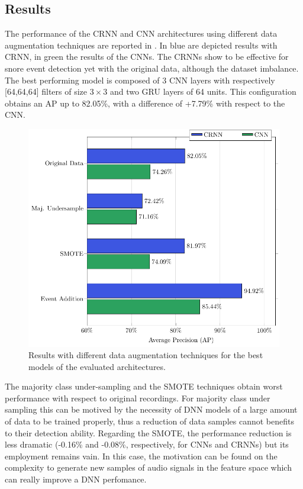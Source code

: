 \subsection{Results}
The performance of the CRNN and CNN architectures using different data augmentation techniques are reported in . In blue are depicted results with CRNN, in green the results of the CNNs. The CRNNs show to be effective for snore event detection yet with the original data, although the dataset imbalance. The best performing model is composed of 3 CNN layers with respectively [64,64,64] filters of size $3\times3$ and two GRU layers of 64 units. This configuration obtains an AP up to 82.05\%, with a difference of +7.79\% with respect to the CNN.

\begin{figure}[h]
	\centering
	\includegraphics[width=0.7\columnwidth]{img/grafTex/results.pdf}
	\caption[Snoring Detection - Results]{Results with different data augmentation techniques for the best models of the evaluated architectures.} 
	\label{fig:results}
\end{figure}

The majority class under-sampling and the SMOTE techniques obtain worst performance with respect to original recordings. For majority class under sampling this can be motived by the necessity of DNN models of a large amount of data to be trained properly, thus a reduction of data samples cannot benefits to their detection ability. Regarding the SMOTE, the performance reduction is less dramatic (-0.16\% and -0.08\%, respectively, for CNNs and CRNNs) but its employment remains vain. In this case, the motivation can be found on the complexity to generate new samples of audio signals in the feature space which can really improve a DNN perfomance.

